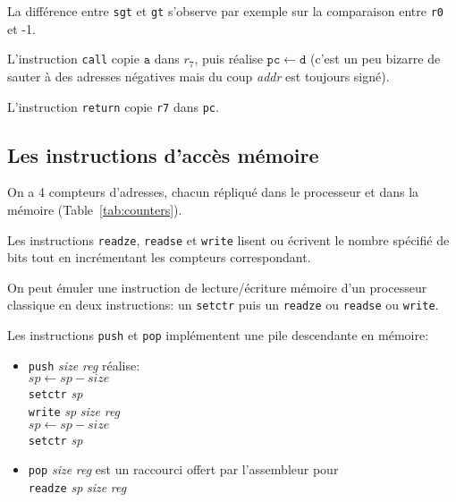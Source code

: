\documentclass[architecture]{compas2018}
\begin{document}
La différence entre \texttt{sgt} et \texttt{gt} s'observe par exemple sur la comparaison entre \texttt{r0} et -1.

L'instruction \texttt{call} copie $\texttt{a}$ dans $r_{7}$, puis réalise $\mathtt{pc} \leftarrow \texttt{d}$
(c'est un peu bizarre de sauter à des adresses négatives mais du coup \emph{addr} est toujours signé).

L'instruction \texttt{return} copie \texttt{r7} dans \texttt{pc}.

\subsection{Les instructions d'accès mémoire}
\label{sec:mem}



On a 4 compteurs d'adresses, chacun  répliqué dans le processeur et dans la mémoire (Table~\ref{tab:counters}).


Les instructions \texttt{readze}, \texttt{readse} et \texttt{write} lisent ou écrivent le nombre spécifié de bits tout en incrémentant les compteurs correspondant.

On peut émuler une instruction de lecture/écriture mémoire d'un processeur classique en deux instructions: un \texttt{setctr} puis un \texttt{readze} ou \texttt{readse} ou \texttt{write}.

Les instructions \texttt{push} et \texttt{pop} implémentent une pile descendante en mémoire: 
\begin{itemize}
\item \texttt{push} \emph{size} \emph{reg} réalise: \\
  $\mathit{sp}\leftarrow \mathit{sp}-\mathit{size}$\\ \texttt{setctr} \textit{sp}\\ \texttt{write}  \textit{sp} \textit{size} \textit{reg} \\   $\mathit{sp}\leftarrow \mathit{sp}-\mathit{size}$\\ \texttt{setctr} \textit{sp}
\item \texttt{pop} \emph{size} \emph{reg} est un raccourci offert par l'assembleur pour \\\texttt{readze} \textit{sp} \emph{size} \emph{reg}\\
  
\end{itemize}
\end{document}
